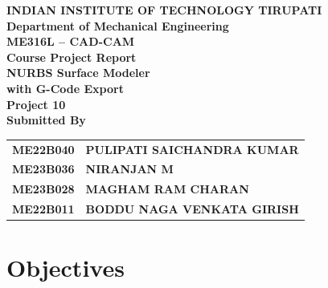 \documentclass[a4paper,12pt]{article}
\begin{document}
\begin{titlepage}
  \centering
  \vspace*{0.6cm}

  {\Large\bfseries INDIAN INSTITUTE OF TECHNOLOGY TIRUPATI}\\[0.3cm]
  {\large\bfseries Department of Mechanical Engineering}\\[1.4cm]

  {\large\bfseries ME316L -- CAD-CAM}\\[0.2cm]
  {\Large\bfseries Course Project Report}\\[1.0cm]

  {\LARGE\bfseries NURBS Surface Modeler}\\[0.25cm]
  {\Large\bfseries with G-Code Export}\\[1.4cm]

  {\large\bfseries Project 10}\\[1.6cm]

  {\large\bfseries Submitted By}\\[0.6cm]

  \begin{tabular}{>{\bfseries}l >{\bfseries}l}
    ME22B040 & PULIPATI SAICHANDRA KUMAR       \\[4pt]
    ME23B036 & NIRANJAN M                      \\[4pt]
    ME23B028 & MAGHAM RAM CHARAN               \\[4pt]
    ME22B011 & BODDU NAGA VENKATA GIRISH       \\
  \end{tabular}

  \vfill
\end{titlepage}

\clearpage

\renewcommand{\contentsname}{\Large\bfseries Contents}
\tableofcontents
\clearpage

\section{Objectives}
\end{document}
